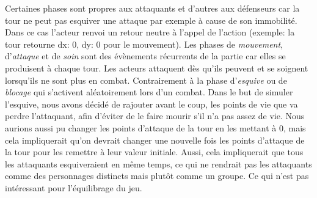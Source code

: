 \documentclass{article}
\begin{document}
Certaines phases sont propres aux attaquants et d'autres aux défenseurs car la tour ne peut pas esquiver une attaque par exemple à cause de son immobilité. Dans ce cas l'acteur renvoi un retour neutre à l'appel de l'action (exemple: la tour retourne dx: 0, dy: 0 pour le mouvement). Les phases de \textit{mouvement}, d'\textit{attaque} et de \textit{soin} sont des évènements récurrents de la partie car elles se produisent à chaque tour. Les acteurs attaquent dès qu'ils peuvent et se soignent lorsqu'ils ne sont plus en combat. Contrairement à la phase d'\textit{esquive} ou de \textit{blocage} qui s'activent aléatoirement lors d'un combat. Dans le but de simuler l'esquive, nous avons décidé de rajouter avant le coup, les points de vie que va perdre l'attaquant, afin d'éviter de le faire mourir s'il n'a pas assez de vie. Nous aurions aussi pu changer les points d'attaque de la tour en les mettant à 0, mais cela impliquerait qu'on devrait changer une nouvelle fois les points d'attaque de la tour pour les remettre à leur valeur initiale. Aussi, cela impliquerait que tous les attaquants esquiveraient en même temps, ce qui ne rendrait pas les attaquants comme des personnages distincts mais plutôt comme un groupe. Ce qui n'est pas intéressant pour l'équilibrage du jeu.

\newpage
\end{document}
